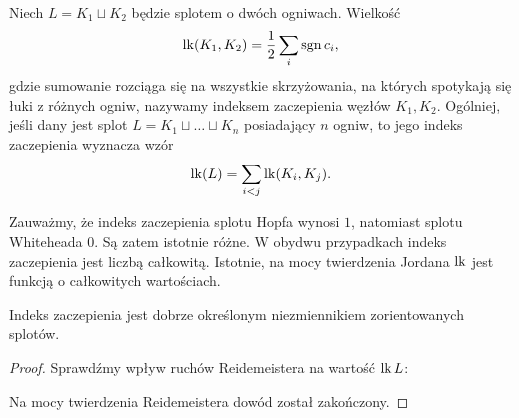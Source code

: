 \begin{definition}
%
    Niech $L = K_1 \sqcup K_2$ będzie splotem o dwóch ogniwach.
    Wielkość
    \begin{equation}
        \operatorname{lk}(K_1, K_2) = \frac 12 \sum_i \operatorname{sgn} c_i,
    \end{equation}
    gdzie sumowanie rozciąga się na wszystkie skrzyżowania, na których spotykają się łuki z różnych ogniw, nazywamy indeksem zaczepienia węzłów $K_1, K_2$.
    Ogólniej, jeśli dany jest splot $L = K_1 \sqcup \ldots \sqcup K_n$ posiadający $n$ ogniw, to jego indeks zaczepienia wyznacza wzór
    \begin{equation}
        \operatorname{lk}(L) = \sum_{i < j} \operatorname{lk}(K_i, K_j).
    \end{equation}
\end{definition}

Zauważmy, że indeks zaczepienia splotu Hopfa wynosi $1$, natomiast splotu Whiteheada $0$.
Są zatem istotnie różne.
W obydwu przypadkach indeks zaczepienia jest liczbą całkowitą.
Istotnie, na mocy twierdzenia Jordana $\operatorname{lk}$ jest funkcją o całkowitych wartościach.

\begin{proposition}
    Indeks zaczepienia jest dobrze określonym niezmiennikiem zorientowanych splotów.
\end{proposition}

\begin{proof}
    Sprawdźmy wpływ ruchów Reidemeistera na wartość $\operatorname{lk} L$:
\begin{comment}
    \begin{figure}[H]
    \centering
    \begin{minipage}[b]{.3\linewidth}
        \[
            \MedLarReidemeisterOneLeft \cong \MedLarReidemeisterOneStraight
        \]
        \subcaption{ruch $R_1$}
    \end{minipage}
    \begin{minipage}[b]{.3\linewidth}
        \[
            \MedLarReidemeisterTwoLinkingA \cong \MedLarReidemeisterTwoB
        \]
        \subcaption{ruch $R_2$}
    \end{minipage}
    \begin{minipage}[b]{.35\linewidth}
        \[
            \MedLarReidemeisterThreeLinkingA \cong \MedLarReidemeisterThreeLinkingB
        \]
        \subcaption{ruch $R_3$}
    \end{minipage}
\end{figure}
\end{comment}
    Na mocy twierdzenia Reidemeistera dowód został zakończony.
\end{proof}



